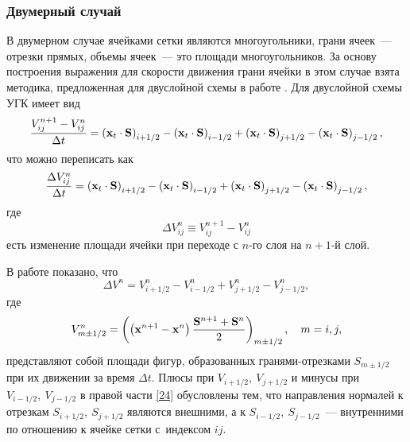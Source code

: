 \subsubsection{Двумерный случай}
\label{s:1232}
В двумерном случае ячейками сетки являются многоугольники, грани ячеек~--- отрезки прямых, объемы 
ячеек~--- это площади многоугольников. За основу построения 
выражения для скорости движения грани ячейки в этом случае взята методика, предложенная для двуслойной схемы 
в работе \cite{demper}. Для двуслойной схемы УГК имеет вид
\begin{equation}
  \label{21} 
  \frac{V_{ij}^{n + 1}  - V_{ij}^n }{\Delta t} = \left(
  {{\bf{x}}_t  \cdot {\bf{S}}} \right)_{i + 1/2}  - \left(
  {{\bf{x}}_t  \cdot {\bf{S}}} \right)_{i - 1/2}  + \left(
  {{\bf{x}}_t  \cdot {\bf{S}}} \right)_{j + 1/2}  - \left(
  {{\bf{x}}_t  \cdot {\bf{S}}} \right)_{j - 1/2},
\end{equation}
что можно переписать как
\begin{equation}
  \label{22} 
  \frac{\Delta V_{ij}^n}{\Delta t}= \left( {{\bf{x}}_t \cdot {\bf{S}}} \right)_{i + 1/2} - 
  \left( {{\bf{x}}_t  \cdot {\bf{S}}} \right)_{i - 1/2}  + \left( {{\bf{x}}_t  \cdot {\bf{S}}}
  \right)_{j + 1/2}  - \left( {{\bf{x}}_t  \cdot {\bf{S}}}
  \right)_{j - 1/2} ,
\end{equation}
где
\begin{equation}
  \label{23} 
  \Delta V_{ij}^n  \equiv V_{ij}^{n + 1} - V_{ij}^n
\end{equation}
есть изменение площади ячейки при переходе с $n$-го слоя на $n+1$-й слой.

В работе \cite{lesoin} показано, что
\begin{equation}
  \label{24} 
  \Delta V_{}^n  = V_{i + 1/2}^n  - V_{i - 1/2}^n  + V_{j + 1/2}^n - V_{j - 1/2}^n,
\end{equation}
где
\begin{equation*}
  V_{m \pm 1/2}^n  = \left( \left( {{\bf{x}}^{n + 1}  - {\bf{x}}^n } \right) {\frac{{{\bf{S}}^{n + 1}
  + {\bf{S}}^n }}{2}} \right)_{m \pm 1/2},\quad m=i,j,
\end{equation*}
представляют собой площади фигур, образованных гранями-отрезками ${{S}}_{m \pm 1/2}$ при их движении за время 
$\Delta t$. Плюсы при $V_{i+1/2},\  V_{j+1/2}$ и минусы при $V_{i-1/2},\  V_{j-1/2}$ в правой части \eqref{24}
обусловлены тем, что направления нормалей к отрезкам ${{S}}_{i+1/2},\  {{S}}_{j+1/2}$ являются внешними, а к
${{S}}_{i-1/2},\  {{S}}_{j-1/2}$~--- внутренними по отношению к ячейке сетки с~индексом $ij$.

